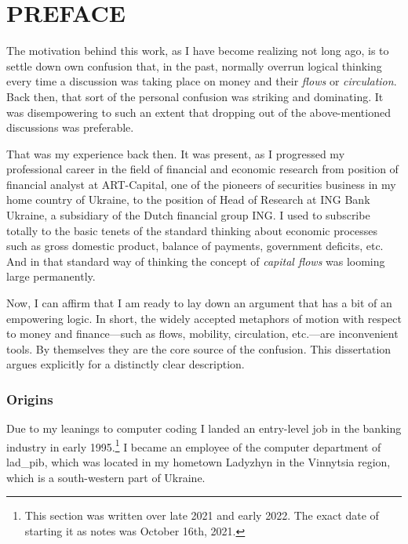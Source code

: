 %
%
\section*{\MakeUppercase{Preface}}

The motivation behind this work, as I have become realizing not long ago, is to settle down own confusion that, in the past, normally overrun logical thinking every time a discussion was taking place on money and their \textit{flows} or \textit{circulation}. Back then, that sort of the personal confusion was striking and dominating. It was disempowering to such an extent that dropping out of the above-mentioned discussions was preferable. 

That was my experience back then. It was present, as I progressed my professional career in the field of financial and economic research from position of financial analyst at ART-Capital, one of the pioneers of securities business in my home country of Ukraine, to the position of Head of Research at ING Bank Ukraine, a subsidiary of the Dutch financial group ING. I used to subscribe totally to the basic tenets of the standard thinking about economic processes such as gross domestic product, balance of payments, government deficits, etc. And in that standard way of thinking the concept of \textit{capital flows} was looming large permanently.

Now, I can affirm that I am ready to lay down an argument that has a bit of an empowering logic. In short, the widely accepted metaphors of motion with respect to money and finance---such as flows, mobility, circulation, etc.---are inconvenient tools. By themselves they are the core source of the confusion. This dissertation argues explicitly for a distinctly clear description.

\subsubsection*{Origins}

Due to my leanings to computer coding I landed an entry-level job in the banking industry in early 1995.\footnote{This section was written over late 2021 and early 2022. The exact date of starting it as notes was October 16th, 2021.} I became an employee of the computer department of \ac{lad_pib}, which was located in my hometown Ladyzhyn in the Vinnytsia region, which is a south-western part of Ukraine.

